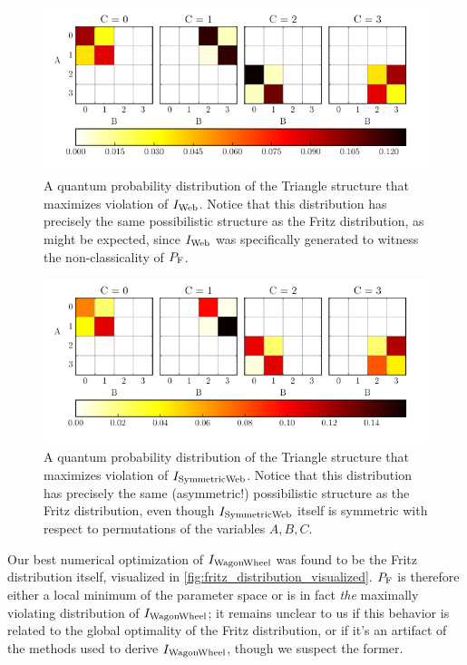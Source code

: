 \documentclass[aps, 10pt, english, twoside, pra, nofootinbib, tightenlines, longbibliography, superscriptaddress]{revtex4-1}
\begin{document}
    \begin{figure}
    \begin{nscenter}
        \includegraphics{figure_plotted_dist_I_1_max_violation.pdf}
        \caption{A quantum probability distribution of the Triangle structure that maximizes violation of $I_\text{Web}$. Notice that this distribution has precisely the same possibilistic structure as the Fritz distribution, as might be expected, since $I_\text{Web}$ was specifically generated to witness the non-classicality of $\prob[\fritz]$.}
        \label{fig:maximum_violation_I_1}
    \end{nscenter}
    \end{figure}
    \begin{figure}
    \begin{nscenter}
        \includegraphics{figure_plotted_dist_I_3_max_violation.pdf}
        \caption{A quantum probability distribution of the Triangle structure that maximizes violation of $I_\text{SymmetricWeb}$. Notice that this distribution has precisely the same (asymmetric!) possibilistic structure as the Fritz distribution, even though $I_\text{SymmetricWeb}$ itself is symmetric with respect to permutations of the variables $A, B, C$. }
        \label{fig:maximum_violation_I_3}
    \end{nscenter}
    \end{figure}

    Our best numerical optimization of $I_\text{WagonWheel}$ was found to be the Fritz distribution itself, visualized in \cref{fig:fritz_distribution_visualized}. $\prob[\fritz]$ is therefore either a local minimum of the parameter space or is in fact \textit{the} maximally violating distribution of $I_\text{WagonWheel}$; it remains unclear to us if this behavior is related to the global optimality of the Fritz distribution, or if it's an artifact of the methods used to derive $I_\text{WagonWheel}$, though we suspect the former.
\end{document}
